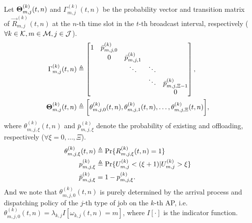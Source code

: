 \begin{definition}
    Let $\boldsymbol{\Theta}^{(k)}_{m,j}(t,n)$ and ${\Gamma}^{(k)}_{m,j}(t,n)$ be the probability vector and transition matrix of $\vec{R}^{(k)}_{m,j}(t,n)$ at the $n$-th time slot in the $t$-th broadcast interval, respectively ($\forall k\in\mathcal{K}, m\in\mathcal{M}, j\in\mathcal{J}$).
    \begin{align}
        \Gamma^{(k)}_{m,j}(t,n) &\triangleq
        \begin{bmatrix}
            1 & \bar{p}^{(k)}_{m,j,0} &                       &        &                           \\
            & 0                     & \bar{p}^{(k)}_{m,j,1} &        &                           \\
            &                       & \ddots                & \ddots &                           \\
            &                       &                       & \ddots & \bar{p}^{(k)}_{m,j,\Xi-1} \\
            &                       &                       &        & 0                         \\
        \end{bmatrix},
        \\
        \boldsymbol{\Theta}^{(k)}_{m,j}(t,n) &\triangleq
        \bigg[ \theta^{(k)}_{m,j,0}(t,n), \theta^{(k)}_{m,j,1}(t,n), \dots, \theta^{(k)}_{m,j,\Xi}(t,n) \bigg],
    \end{align}
    where $\theta^{(k)}_{m,j,\xi}(t,n)$ and $\bar{p}^{(k)}_{m,j,\xi}$ denote the probability of existing and offloading, respectively ($\forall \xi=0,\dots,\Xi$).
    \begin{align}
        \theta^{(k)}_{m,j,\xi}(t,n) &\triangleq \Pr\{R^{(k)}_{m,j,\xi}(t,n) = 1\}
        \\
        p^{(k)}_{m,j,\xi} &\triangleq \Pr\{U^{(k)}_{m,j} < (\xi+1) | U^{(k)}_{m,j}>\xi\}
        \\
        \bar{p}^{(k)}_{m,j,\xi} &= 1 - p^{(k)}_{m,j,\xi}.
    \end{align}
    And we note that $\theta^{(k)}_{m,j,0}(t,n)$ is purely determined by the arrival process and dispatching policy of the $j$-th type of job on the $k$-th AP, i.e. $\theta^{(k)}_{m,j,0}(t,n) = \lambda_{k,j} I[\omega_{k,j}(t,n) = m]$, where $I[\cdot]$ is the indicator function.


\end{definition}
